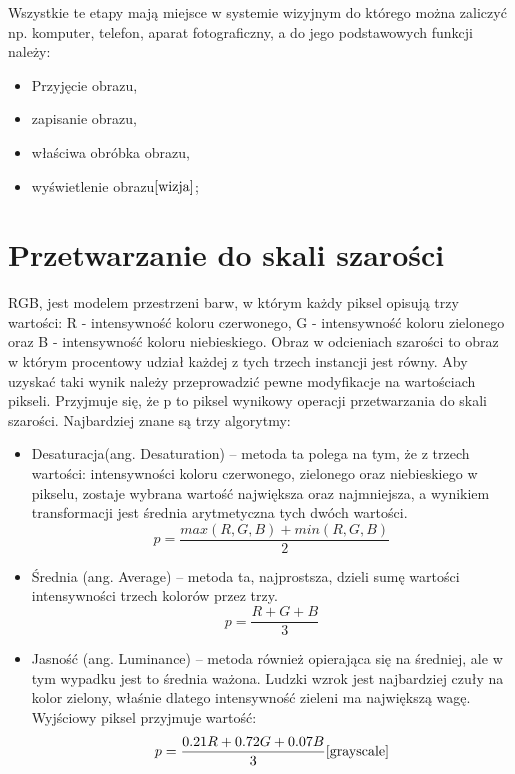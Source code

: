 \documentclass[eng,oneside]{mgr}
\begin{document}
\par Wszystkie te etapy mają miejsce w systemie wizyjnym do którego można zaliczyć np. komputer, telefon, aparat fotograficzny, a do jego podstawowych funkcji należy:
\begin{itemize}
\item Przyjęcie obrazu,
\item zapisanie obrazu,
\item właściwa obróbka obrazu,
\item wyświetlenie obrazu$\cite{wizja}$;
\end{itemize}

\section{Przetwarzanie do skali szarości}
RGB, jest modelem przestrzeni barw, w którym każdy piksel opisują trzy wartości: R - intensywność koloru czerwonego, G - intensywność koloru zielonego oraz B - intensywność koloru niebieskiego. Obraz w odcieniach szarości to obraz w którym procentowy udział każdej z tych trzech instancji jest równy. Aby uzyskać taki wynik należy przeprowadzić pewne modyfikacje na wartościach pikseli. Przyjmuje się, że p to piksel wynikowy operacji przetwarzania do skali szarości. Najbardziej znane są trzy algorytmy:
\begin{itemize}
\item Desaturacja(ang. Desaturation) – metoda ta polega na tym, że z trzech wartości: intensywności koloru czerwonego, zielonego oraz niebieskiego w pikselu, zostaje wybrana wartość największa oraz najmniejsza, a wynikiem transformacji jest średnia arytmetyczna tych dwóch wartości.
\\
\begin{equation}
p=\frac{max(R,G,B) + min(R,G,B)}{2}
\end{equation}
\item Średnia (ang. Average) – metoda ta, najprostsza, dzieli sumę wartości intensywności trzech kolorów przez trzy.
\\
\begin{equation}
p=\frac{R + G + B}{3}
\end{equation}
\item Jasność (ang. Luminance) – metoda również opierająca się na średniej, ale w tym wypadku jest to średnia ważona. Ludzki wzrok jest najbardziej czuły na kolor zielony, właśnie dlatego intensywność zieleni ma największą wagę. Wyjściowy piksel przyjmuje wartość:
\\
\begin{equation}
p=\frac{0.21R + 0.72G + 0.07B}{3}\cite{grayscale}
\end{equation}

\end{itemize}
\end{document}
